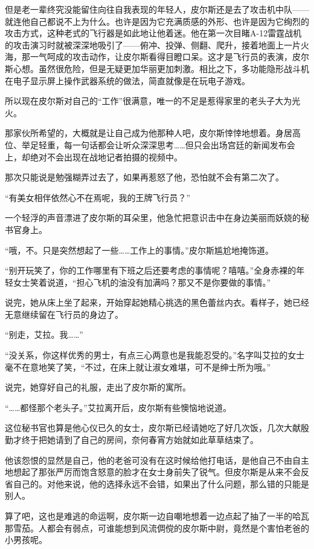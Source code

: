 但是老一辈终究没能留住向往自我表现的年轻人，皮尔斯还是去了攻击机中队——就连他自己都说不上为什么。也许是因为它充满质感的外形、也许是因为它绚烈的攻击方式，这种老式的飞行器是如此地让他着迷。他在第一次目睹A-12雷霆战机的攻击演习时就被深深地吸引了——俯冲、投弹、侧翻、爬升，接着地面上一片火海，那一气呵成的攻击动作，让皮尔斯看得目瞪口呆。这才是飞行员的表演，皮尔斯心想。虽然很危险，但是无疑更加华丽更加刺激。相比之下，多功能隐形战斗机在电子显示屏上操作武器系统的做法，简直就像是在玩电子游戏。

所以现在皮尔斯对自己的“工作”很满意，唯一的不足是惹得家里的老头子大为光火。

那家伙所希望的，大概就是让自己成为他那种人吧，皮尔斯悻悻地想着。身居高位、举足轻重，每一句话都会让听众深深思考……但只会出场宫廷的新闻发布会上，却绝对不会出现在战地记者拍摄的视频中。

那次只能说是勉强糊弄过去了，如果再惹怒了他，恐怕就不会有第二次了。

“有美女相伴依然心不在焉呢，我的王牌飞行员？”

一个轻浮的声音漂进了皮尔斯的耳朵里，他急忙把意识击中在身边美丽而妖娆的秘书官身上。

“哦，不。只是突然想起了一些……工作上的事情。”皮尔斯尴尬地掩饰道。

“别开玩笑了，你的工作哪里有下班之后还要考虑的事情呢？嘻嘻。”全身赤裸的年轻女士笑着说道，“担心飞机的油没有加满吗？那又不是你要做的事情。”

说完，她从床上坐了起来，开始穿起她精心挑选的黑色蕾丝内衣。看样子，她已经无意继续留在飞行员的身边了。

“别走，艾拉。我……”

“没关系，你这样优秀的男士，有点三心两意也是我能忍受的。”名字叫艾拉的女士毫不在意地笑了笑，“不过，在床上就让淑女难堪，可不是绅士所为哦。”

说完，她穿好自己的礼服，走出了皮尔斯的寓所。

“……都怪那个老头子。”艾拉离开后，皮尔斯有些懊恼地说道。

这位秘书官也算是他心仪已久的女士，皮尔斯已经请她吃了好几次饭，几次大献殷勤才终于把她请到了自己的房间，奈何春宵方始就如此草草结束了。

他该怨恨的显然是自己，他的老爸可没有在这时候给他打电话，是他自己不由自主地想起了那张严厉而饱含怒意的脸才在女士身前失了锐气。但皮尔斯是从来不会反省自己的。对他来说，他的选择永远不会错，如果出了什么问题，那么错的只能是别人。

算了吧，这也是难逃的命运啊，皮尔斯一边自嘲地想着一边点起了抽了一半的哈瓦那雪茄。人都会有弱点，可谁能想到风流倜傥的皮尔斯中尉，竟然是个害怕老爸的小男孩呢。

